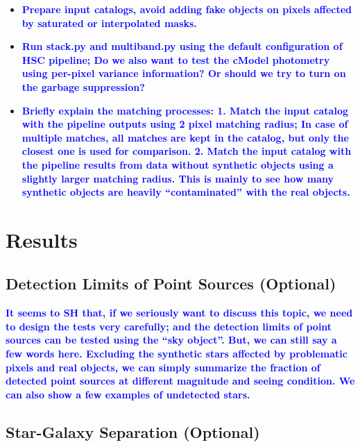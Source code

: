 \documentclass{pasj01}
\newcommand{\plan}[1]{\textcolor{blue} {\textbf{#1}}}
\begin{document}
    \begin{itemize}
        \item \plan{Prepare input catalogs, avoid adding fake objects on pixels affected 
                    by saturated or interpolated masks.} 
        \item \plan{Run stack.py and multiband.py using the default configuration of 
                    HSC pipeline; Do we also want to test the cModel photometry using 
                    per-pixel variance information?  Or should we try to turn on the 
                    garbage suppression?}
        \item \plan{Briefly explain the matching processes:
                    1. Match the input catalog with the pipeline outputs using 2 pixel 
                       matching radius; In case of multiple matches, all matches are kept 
                       in the catalog, but only the closest one is used for comparison.
                    2. Match the input catalog with the pipeline results from data without 
                       synthetic objects using a slightly larger matching radius.  This is 
                       mainly to see how many synthetic objects are heavily ``contaminated''
                       with the real objects.}
    \end{itemize}


\section{Results}

\subsection{Detection Limits of Point Sources (Optional)}

    \plan{It seems to SH that, if we seriously want to discuss this topic, we need to 
          design the tests very carefully; and the detection limits of point sources can 
          be tested using the ``sky object''. 
          But, we can still say a few words here.  Excluding the synthetic stars affected 
          by problematic pixels and real objects, we can simply summarize the fraction of 
          detected point sources at different magnitude and seeing condition.  
          We can also show a few examples of undetected stars.}
    
\subsection{Star-Galaxy Separation (Optional)}
\end{document}
